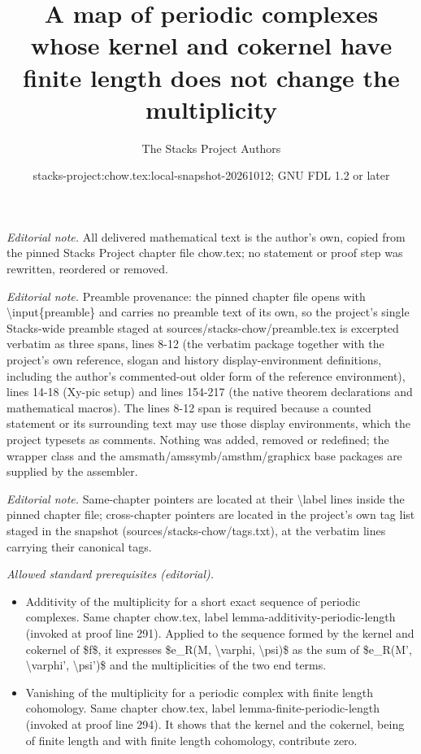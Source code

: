 \documentclass[10pt,a4paper]{amsart}
\title{A map of periodic complexes whose kernel and cokernel have finite length does not change the multiplicity}
\author{The Stacks Project Authors}
\date{stacks-project:chow.tex:local-snapshot-20261012; GNU FDL 1.2 or later}
\theoremstyle{plain}
\theoremstyle{definition}
\theoremstyle{remark}
\numberwithin{equation}{subsection}
\begin{document}
\maketitle
\noindent\textit{Editorial note.} All delivered mathematical text is the author's own, copied from the pinned Stacks Project chapter file chow.tex; no statement or proof step was rewritten, reordered or removed.\par\medskip
\noindent\textit{Editorial note.} Preamble provenance: the pinned chapter file opens with \textbackslash{}input\{preamble\} and carries no preamble text of its own, so the project's single Stacks-wide preamble staged at sources/stacks-chow/preamble.tex is excerpted verbatim as three spans, lines 8-12 (the verbatim package together with the project's own reference, slogan and history display-environment definitions, including the author's commented-out older form of the reference environment), lines 14-18 (Xy-pic setup) and lines 154-217 (the native theorem declarations and mathematical macros). The lines 8-12 span is required because a counted statement or its surrounding text may use those display environments, which the project typesets as comments. Nothing was added, removed or redefined; the wrapper class and the amsmath/amssymb/amsthm/graphicx base packages are supplied by the assembler.\par\medskip
\noindent\textit{Editorial note.} Same-chapter pointers are located at their \textbackslash{}label lines inside the pinned chapter file; cross-chapter pointers are located in the project's own tag list staged in the snapshot (sources/stacks-chow/tags.txt), at the verbatim lines carrying their canonical tags.\par\medskip
\noindent\textit{Allowed standard prerequisites (editorial).}\begin{itemize}
\item Additivity of the multiplicity for a short exact sequence of periodic complexes. Same chapter chow.tex, label lemma-additivity-periodic-length (invoked at proof line 291). Applied to the sequence formed by the kernel and cokernel of \$f\$, it expresses \$e\_R(M, \textbackslash{}varphi, \textbackslash{}psi)\$ as the sum of \$e\_R(M', \textbackslash{}varphi', \textbackslash{}psi')\$ and the multiplicities of the two end terms.
\item Vanishing of the multiplicity for a periodic complex with finite length cohomology. Same chapter chow.tex, label lemma-finite-periodic-length (invoked at proof line 294). It shows that the kernel and the cokernel, being of finite length and with finite length cohomology, contribute zero.
\end{itemize}\medskip
\end{document}
